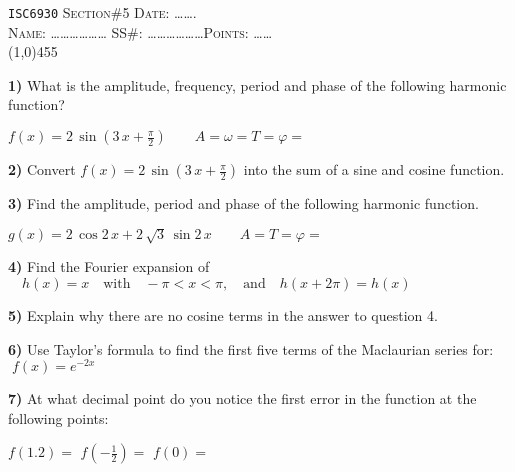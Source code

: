 \documentclass[11pt]{article}
\begin{document}
\begin{flushleft}
\large \verb"ISC6930"\hspace{5.1cm} \textsc{Section}\#5  \hspace{4.cm} \textsc{Date:} \ldots\ldots. \\
\vspace*{.3cm} \large \textsc{Name:}
\ldots\ldots\ldots\ldots\ldots\ldots\hspace{1.85cm} SS\#:
\ldots\ldots\ldots\ldots\ldots\ldots\hspace{2cm}\textsc{Points:} \ldots\ldots\\
\line(1,0){455}
\end{flushleft}

\normalsize

\textbf{1)} What is the amplitude, frequency, period and phase of
the following harmonic function?

\hspace*{4mm} $f(x) = 2\,\sin(3\,x + \frac{\pi}{2})
\qquad A =$\hspace*{2cm}$\omega =$\hspace*{2cm}$T =$\hspace*{2cm}$\varphi=$\hspace*{2cm} \vs

\textbf{2)} Convert $f(x) = 2\,\sin(3\,x + \frac{\pi}{2})$ into the sum of a sine and cosine
function. \vs

\textbf{3)} Find the amplitude, period and phase of the following harmonic function.

\hspace*{4mm} $g(x) = 2\,\cos 2\,x + 2\, \sqrt{3} \,\sin 2\,x 
\qquad A =$\hspace*{2.cm}$T =$\hspace*{2.cm}$\varphi=$\hspace*{2cm} \vs

\textbf{4)} Find the Fourier expansion of $\quad h(x) = x \quad \mbox{with} \quad -\pi<x<\pi, 
\quad \mbox{and} \quad h(x + 2\pi) = h(x)$ \vs

\textbf{5)} Explain why there are no cosine terms in the answer to question 4. \vs

\textbf{6)} Use Taylor's formula to find the first five terms of the Maclaurian series for:
$\; f(x) = e^{-2x}$ \vs

\textbf{7)} At what decimal point do you notice the first error in the function at the following points:

\hspace*{4mm} $f(1.2)= $\hspace*{2.5cm} $f(-\frac{1}{2})= $\hspace*{2.5cm} $f(0)= $
\end{document}
